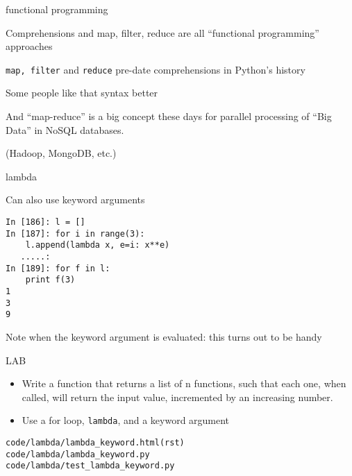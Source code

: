 \documentclass{beamer}
\begin{document}
\begin{frame}[fragile]{functional programming}

\vfill
{\Large Comprehensions and map, filter, reduce are all ``functional programming'' approaches}

\vfill
{\Large \verb|map, filter| and \verb|reduce| pre-date comprehensions in Python's history}

\vfill
{\Large Some people like that syntax better}

\vfill
{\Large And ``map-reduce'' is a big concept these days for parallel processing of ``Big Data'' in NoSQL databases.}

\vfill
{\Large (Hadoop, MongoDB, etc.) }

\end{frame} 


\begin{frame}[fragile]{lambda}

{\Large Can also use keyword arguments}

\begin{verbatim}
In [186]: l = []
In [187]: for i in range(3):
    l.append(lambda x, e=i: x**e)
   .....:     
In [189]: for f in l:
    print f(3)
1
3
9
\end{verbatim}

{\Large Note when the keyword argument is evaluated: this turns out to be handy}

\end{frame} 
\begin{frame}[fragile]{LAB}

{\large
\vfill
\begin{itemize}
  \item Write a function that returns a list of n functions,
such that each one, when called, will return the input value,
incremented by an increasing number.

  \item Use a for loop, \verb|lambda|, and a keyword argument
\end{itemize}

\vfill
\verb|code/lambda/lambda_keyword.html(rst)| \\
\verb|code/lambda/lambda_keyword.py| \\
\verb|code/lambda/test_lambda_keyword.py| \\
}

\end{frame}
\end{document}
